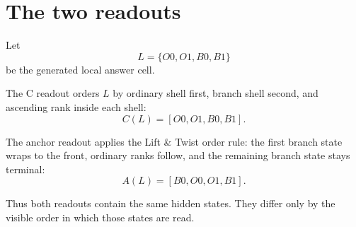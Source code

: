 \section{The two readouts}

Let
\[
    L=\{O0,O1,B0,B1\}
\]
be the generated local answer cell.

The C readout orders \(L\) by ordinary shell first, branch shell second, and ascending rank inside each shell:
\[
    C(L)=[O0,O1,B0,B1].
\]

The anchor readout applies the Lift \& Twist order rule: the first branch state wraps to the front, ordinary ranks follow, and the remaining branch state stays terminal:
\[
    A(L)=[B0,O0,O1,B1].
\]

Thus both readouts contain the same hidden states.  They differ only by the visible order in which those states are read.
